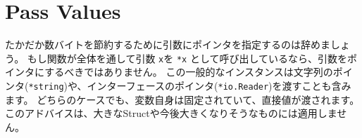 \section{Pass Values}

たかだか数バイトを節約するために引数にポインタを指定するのは辞めましょう。 もし関数が全体を通して引数 \texttt{x}を \texttt{*x} として呼び出しているなら、引数をポインタにするべきではありません。 この一般的なインスタンスは文字列のポインタ(\texttt{*string})や、インターフェースのポインタ(\texttt{*io.Reader})を渡すことも含みます。 どちらのケースでも、変数自身は固定されていて、直接値が渡されます。 このアドバイスは、大きなStructや今後大きくなりそうなものには適用しません。

